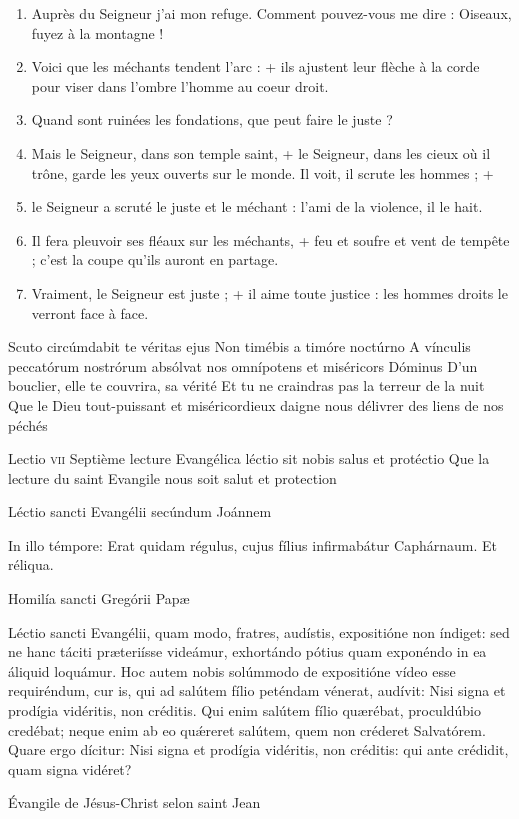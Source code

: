 \documentclass[twoside]{article}
\begin{document}
\begin{paracol}[1]{2}
\begin{enumerate}[wide, itemsep=0mm, labelwidth=!, labelindent=0pt, label=\color{gregoriocolor}\theenumi]
\item Auprès du Seigneur j'ai mon refuge. Comment pouvez-vous me dire : Oiseaux, fuyez à la montagne !
\item Voici que les méchants tendent l'arc : + ils ajustent leur flèche à la corde pour viser dans l'ombre l'homme au coeur droit.
\item Quand sont ruinées les fondations, que peut faire le juste ?
\item Mais le Seigneur, dans son temple saint, + le Seigneur, dans les cieux où il trône, garde les yeux ouverts sur le monde. Il voit, il scrute les hommes ; +
\item le Seigneur a scruté le juste et le méchant : l'ami de la violence, il le hait.
\item Il fera pleuvoir ses fléaux sur les méchants, + feu et soufre et vent de tempête ; c'est la coupe qu'ils auront en partage.
\item Vraiment, le Seigneur est juste ; + il aime toute justice : les hommes droits le verront face à face.
\end{enumerate}

\switchcolumn*

\versiculusabsolutio
	{Scuto circúmdabit te véritas ejus}
	{Non timébis a timóre noctúrno}
	{A vínculis peccatórum nostrórum absólvat nos omnípotens et miséricors Dóminus}
	{D’un bouclier, elle te couvrira, sa vérité}
	{Et tu ne craindras pas la terreur de la nuit}
	{Que le Dieu tout-puissant et miséricordieux daigne nous délivrer des liens de nos péchés}

\lectioresponsorium
	{Lectio \textsc{vii}}
	{Septième lecture}
	{Evangélica léctio sit nobis salus et protéctio}
	{Que la lecture du saint Evangile nous soit salut et protection}
	{
		Léctio sancti Evangélii secúndum Joánnem
		
		In illo témpore: Erat quidam régulus, cujus fílius infirmabátur Caphárnaum. Et réliqua.
		\pagebreak

		Homilía sancti Gregórii Papæ

		Léctio sancti Evangélii, quam modo, fratres, audístis, expositióne non índiget: sed ne hanc táciti præteriísse videámur, exhortándo pótius quam exponéndo in ea áliquid loquámur. Hoc autem nobis solúmmodo de expositióne vídeo esse requiréndum, cur is, qui ad salútem fílio peténdam vénerat, audívit: Nisi signa et prodígia vidéritis, non créditis. Qui enim salútem fílio quærébat, proculdúbio credébat; neque enim ab eo quǽreret salútem, quem non créderet Salvatórem. Quare ergo dícitur: Nisi signa et prodígia vidéritis, non créditis: qui ante crédidit, quam signa vidéret?
	}
	{
		Évangile de Jésus-Christ selon saint Jean
		
}
\end{paracol}
\end{document}
